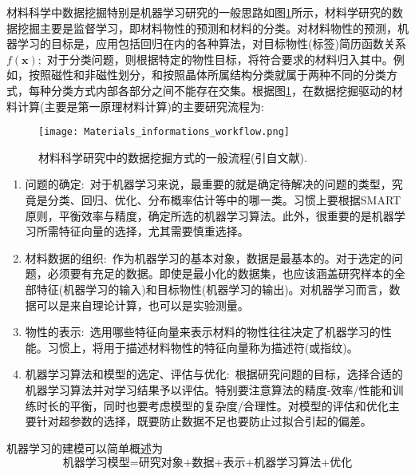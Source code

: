 \documentclass[10pt, oneside, a4paper]{article}      %
\newcommand{\upcite}[1]{\hspace{0ex}\textsuperscript{\cite{#1}}} %
\begin{document}
材料科学中数据挖掘特别是机器学习研究的一般思路如图\ref{npjCM}所示，材料学研究的数据挖掘主要是监督学习，即材料物性的预测和材料的分类。对材料物性的预测，机器学习的目标是，应用包括回归在内的各种算法，对目标物性(标签)简历函数关系$f(\mathbf{x})$;~对于分类问题，则根据特定的物性目标，将符合要求的材料归入其中。例如，按照磁性和非磁性划分，和按照晶体所属结构分类就属于两种不同的分类方式，每种分类方式内部各部分之间不能存在交集。根据图\ref{npjCM}，在数据挖掘驱动的材料计算(主要是第一原理材料计算)的主要研究流程为:
\begin{figure}[h!]
\centering
\vspace*{-0.1in}
\texttt{[image: Materials\_informations\_workflow.png]}
\caption{\textrm{材料科学研究中的数据挖掘方式的一般流程(引自文献\cite{NPJCM3-54_2017}).}}%
\label{npjCM}
\end{figure}
\begin{enumerate}
	\item 问题的确定:~对于机器学习来说，最重要的就是确定待解决的问题的类型，究竟是分类、回归、优化、分布概率估计等中的哪一类。习惯上要根据\textrm{SMART}原则，平衡效率与精度，确定所选的机器学习算法。此外，很重要的是机器学习所需特征向量的选择，尤其需要慎重选择。
	\item 材料数据的组织:~作为机器学习的基本对象，数据是最基本的。对于选定的问题，必须要有充足的数据。即使是最小化的数据集，也应该涵盖研究样本的全部特征(机器学习的输入)和目标物性(机器学习的输出)。对机器学习而言，数据可以是来自理论计算，也可以是实验测量。
	\item 物性的表示:~选用哪些特征向量来表示材料的物性往往决定了机器学习的性能。习惯上，将用于描述材料物性的特征向量称为描述符\upcite{PRL114-105503_2015}(或指纹)。
	\item 机器学习算法和模型的选定、评估与优化:~根据研究问题的目标，选择合适的机器学习算法并对学习结果予以评估。特别要注意算法的精度-效率/性能和训练时长的平衡，同时也要考虑模型的复杂度/合理性。对模型的评估和优化主要针对超参数的选择，既要防止数据不足也要防止过拟合引起的偏差。
\end{enumerate}
机器学习的建模可以简单概述为
\begin{displaymath}
	\mbox{机器学习模型=研究对象+数据+表示+机器学习算法+优化}
\end{displaymath}
\end{document}
